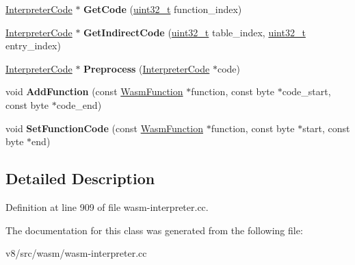 \begin{DoxyCompactItemize}
\mbox{\label{classv8_1_1internal_1_1wasm_1_1CodeMap_ac61a19adb38fefa0310be7d8e04c5938}} 
\mbox{\hyperlink{structv8_1_1internal_1_1wasm_1_1InterpreterCode}{Interpreter\+Code}} $\ast$ {\bfseries Get\+Code} (\mbox{\hyperlink{classuint32__t}{uint32\+\_\+t}} function\+\_\+index)
\item 
\mbox{\label{classv8_1_1internal_1_1wasm_1_1CodeMap_aafd36ea799b794146f63f22d9e972201}} 
\mbox{\hyperlink{structv8_1_1internal_1_1wasm_1_1InterpreterCode}{Interpreter\+Code}} $\ast$ {\bfseries Get\+Indirect\+Code} (\mbox{\hyperlink{classuint32__t}{uint32\+\_\+t}} table\+\_\+index, \mbox{\hyperlink{classuint32__t}{uint32\+\_\+t}} entry\+\_\+index)
\item 
\mbox{\label{classv8_1_1internal_1_1wasm_1_1CodeMap_abba549642462ee8e6e3e25f038288095}} 
\mbox{\hyperlink{structv8_1_1internal_1_1wasm_1_1InterpreterCode}{Interpreter\+Code}} $\ast$ {\bfseries Preprocess} (\mbox{\hyperlink{structv8_1_1internal_1_1wasm_1_1InterpreterCode}{Interpreter\+Code}} $\ast$code)
\item 
\mbox{\label{classv8_1_1internal_1_1wasm_1_1CodeMap_a9393fd273714d662aa16543666cc8deb}} 
void {\bfseries Add\+Function} (const \mbox{\hyperlink{structv8_1_1internal_1_1wasm_1_1WasmFunction}{Wasm\+Function}} $\ast$function, const byte $\ast$code\+\_\+start, const byte $\ast$code\+\_\+end)
\item 
\mbox{\label{classv8_1_1internal_1_1wasm_1_1CodeMap_ae1d41f2ddfb05bb1af2670e25a62945b}} 
void {\bfseries Set\+Function\+Code} (const \mbox{\hyperlink{structv8_1_1internal_1_1wasm_1_1WasmFunction}{Wasm\+Function}} $\ast$function, const byte $\ast$start, const byte $\ast$end)
\end{DoxyCompactItemize}


\subsection{Detailed Description}


Definition at line 909 of file wasm-\/interpreter.\+cc.



The documentation for this class was generated from the following file\+:\begin{DoxyCompactItemize}
\item 
v8/src/wasm/wasm-\/interpreter.\+cc\end{DoxyCompactItemize}
